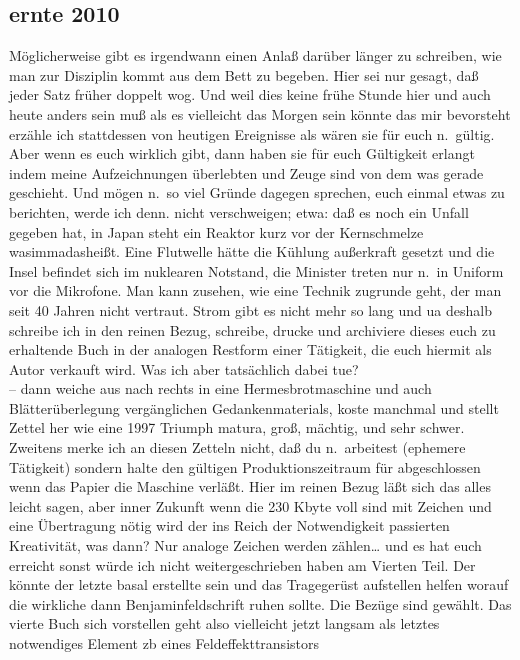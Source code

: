 \documentclass[
]{article}
\author{}
\date{\vspace{-2.5em}}
\begin{document}
\subsection{ernte 2010}\label{ernte-2010}

Möglicherweise gibt es irgendwann einen Anlaß darüber länger zu
schreiben, wie man zur Disziplin kommt aus dem Bett zu begeben. Hier sei
nur gesagt, daß jeder Satz früher doppelt wog. Und weil dies keine frühe
Stunde hier und auch heute anders sein muß als es vielleicht das Morgen
sein könnte das mir bevorsteht erzähle ich stattdessen von heutigen
Ereignisse als wären sie für euch n.~gültig. Aber wenn es euch wirklich
gibt, dann haben sie für euch Gültigkeit erlangt indem meine
Aufzeichnungen überlebten und Zeuge sind von dem was gerade geschieht.
Und mögen n.~so viel Gründe dagegen sprechen, euch einmal etwas zu
berichten, werde ich denn. nicht verschweigen; etwa: daß es noch ein
Unfall gegeben hat, in Japan steht ein Reaktor kurz vor der Kernschmelze
wasimmadasheißt. Eine Flutwelle hätte die Kühlung außerkraft gesetzt und
die Insel befindet sich im nuklearen Notstand, die Minister treten nur
n.~in Uniform vor die Mikrofone. Man kann zusehen, wie eine Technik
zugrunde geht, der man seit 40 Jahren nicht vertraut. Strom gibt es
nicht mehr so lang und ua deshalb schreibe ich in den reinen Bezug,
schreibe, drucke und archiviere dieses euch zu erhaltende Buch in der
analogen Restform einer Tätigkeit, die euch hiermit als Autor verkauft
wird. Was ich aber tatsächlich dabei tue?\\
-- dann weiche aus nach rechts in eine Hermesbrotmaschine und auch
Blätterüberlegung vergänglichen Gedankenmaterials, koste manchmal und
stellt Zettel her wie eine 1997 Triumph matura, groß, mächtig, und sehr
schwer. Zweitens merke ich an diesen Zetteln nicht, daß du n.~arbeitest
(ephemere Tätigkeit) sondern halte den gültigen Produktionszeitraum für
abgeschlossen wenn das Papier die Maschine verläßt. Hier im reinen Bezug
läßt sich das alles leicht sagen, aber inner Zukunft wenn die 230 Kbyte
voll sind mit Zeichen und eine Übertragung nötig wird der ins Reich der
Notwendigkeit passierten Kreativität, was dann? Nur analoge Zeichen
werden zählen\ldots{} und es hat euch erreicht sonst würde ich nicht
weitergeschrieben haben am Vierten Teil. Der könnte der letzte basal
erstellte sein und das Tragegerüst aufstellen helfen worauf die
wirkliche dann Benjaminfeldschrift ruhen sollte. Die Bezüge sind
gewählt. Das vierte Buch sich vorstellen geht also vielleicht jetzt
langsam als letztes notwendiges Element zb eines Feldeffekttransistors
\end{document}
